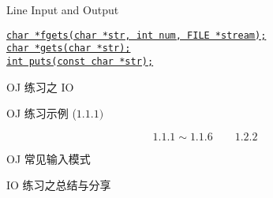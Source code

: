 \begin{frame}{Line Input and Output}
  \begin{center}
    \href{http://www.cplusplus.com/reference/cstdio/fgets/}
    {\texttt{char *fgets(char *str, int num, FILE *stream);}}  \\[0.30cm]

    \href{http://www.cplusplus.com/reference/cstdio/gets/}{\texttt{char *gets(char *str);}}  \\[0.50cm]

    \href{http://www.cplusplus.com/reference/cstdio/puts/}
    {\texttt{int puts(const char *str);}}
  \end{center}
\end{frame}

\begin{frame}{OJ 练习之 IO}
  \centerline{OJ 练习示例 ($1.1.1)$}

  \vspace{0.80cm}
  \pause
  \[
    1.1.1 \sim 1.1.6 \qquad 1.2.2
  \]
\end{frame}

\begin{frame}{OJ 常见输入模式}
  \centerline{IO 练习之总结与分享}
\end{frame}

